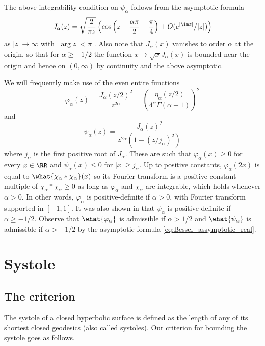 \documentclass[12pt]{amsart}
\numberwithin{equation}{section}
\begin{document}
The above integrability condition on $\psi_\alpha$ follows from the asymptotic formula
\begin{equation} \label{eq:Bessel_assymptotic_real}
J_\alpha(z) = \sqrt{\frac{2}{\pi z}} \left( \cos \left( z - \frac{\alpha \pi}{2} - \frac{\pi}{4} \right) + O(e^{|\im z|}/|z|) \right)
\end{equation}
as $|z| \to \infty$ with $|\arg z| < \pi$ \cite[p.364]{Handbook}.
Also note that $J_\alpha(x)$ vanishes to order $\alpha$ at the origin, so that for $\alpha \geq -1/2$ the function $x\mapsto \sqrt{x}J_\alpha(x)$ is bounded near the origin and hence on $(0,\infty)$ by continuity and the above asymptotic. 

We will frequently make use of the even entire functions
\[
\varphi_\alpha(z)=\frac{J_\alpha(z/2)^2}{z^{2\alpha}} = \left( \frac{\eta_\alpha(z/2)}{4^\alpha \Gamma(\alpha+1)} \right)^2
\]
and
\[
\psi_\alpha(z)=\frac{J_\alpha(z)^2}{z^{2\alpha}(1- (z/j_\alpha)^2)}
\]
where $j_\alpha$ is the first positive root of $J_\alpha$. These are such that $\varphi_\alpha(x) \geq 0$ for every $x \in \RR$ and $\psi_{\alpha}(x)\leq 0$ for $|x|\geq j_\alpha$. Up to positive constants, $\varphi_\alpha(2x)$ is equal to $\what{\chi_\alpha \ast \chi_\alpha}(x)$ so its Fourier transform is a positive constant multiple of $\chi_\alpha \ast \chi_\alpha \geq 0$ as long as $\varphi_\alpha$ and $\chi_\alpha$ are integrable, which holds whenever $\alpha>0$. In other words, $\varphi_\alpha$ is positive-definite if $\alpha >0$, with Fourier transform supported in $[-1,1]$. It was also shown in \cite[Remark 1.1]{Gorbachev} that $\psi_\alpha$ is positive-definite if $\alpha \geq -1/2$. Observe that $\what{\varphi_\alpha}$ is admissible if $\alpha > 1/2$ and $\what{\psi_\alpha}$ is admissible if $\alpha>-1/2$ by the asymptotic formula \eqref{eq:Bessel_assymptotic_real}.



\section{Systole}\label{sec:Systole}

\subsection{The criterion}
The systole of a closed hyperbolic surface is defined as the length of any of its shortest closed geodesics (also called systoles).  Our criterion for bounding the systole goes as follows.
\end{document}
